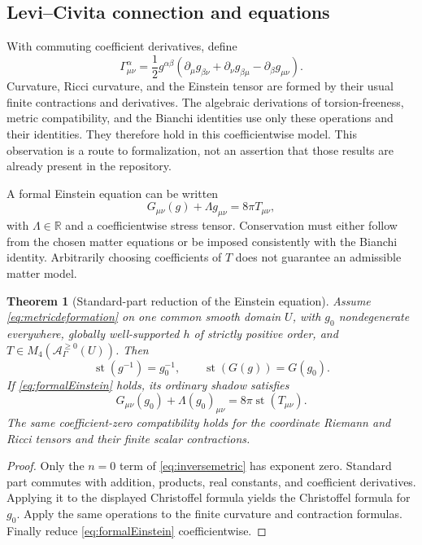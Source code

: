 \documentclass[11pt,a4paper]{article}
\numberwithin{equation}{section}
\newtheorem{theorem}{Theorem}[section]
\theoremstyle{definition}
\theoremstyle{remark}
\newcommand{\R}{\mathbb R}
\newcommand{\Alg}{\mathcal A_{\Gamma}}
\DeclareMathOperator{\st}{st}
\begin{document}
\subsection{Levi--Civita connection and equations}
With commuting coefficient derivatives, define
\begin{equation}
 \Gamma^\alpha_{\mu\nu}
 =\frac12 g^{\alpha\beta}
 (\partial_\mu g_{\beta\nu}+\partial_\nu g_{\beta\mu}
 -\partial_\beta g_{\mu\nu}).
\end{equation}
Curvature, Ricci curvature, and the Einstein tensor are formed by their usual finite contractions and derivatives. The algebraic derivations of torsion-freeness, metric compatibility, and the Bianchi identities use only these operations and their identities. They therefore hold in this coefficientwise model. This observation is a route to formalization, not an assertion that those results are already present in the repository.

A formal Einstein equation can be written
\begin{equation}\label{eq:formalEinstein}
 G_{\mu\nu}(g)+\Lambda g_{\mu\nu}=8\pi T_{\mu\nu},
\end{equation}
with $\Lambda\in\R$ and a coefficientwise stress tensor. Conservation must either follow from the chosen matter equations or be imposed consistently with the Bianchi identity. Arbitrarily choosing coefficients of $T$ does not guarantee an admissible matter model.

\begin{theorem}[Standard-part reduction of the Einstein equation]\label{thm:reduction}
Assume \eqref{eq:metricdeformation} on one common smooth domain $U$, with $g_0$ nondegenerate everywhere, globally well-supported $h$ of strictly positive order, and $T\in M_4(\Alg^{\geq0}(U))$. Then
\begin{equation}\label{eq:Einsteinreduction}
 \st(g^{-1})=g_0^{-1},\qquad
 \st(G(g))=G(g_0).
\end{equation}
If \eqref{eq:formalEinstein} holds, its ordinary shadow satisfies
\begin{equation}
 G_{\mu\nu}(g_0)+\Lambda(g_0)_{\mu\nu}
 =8\pi\st(T_{\mu\nu}).
\end{equation}
The same coefficient-zero compatibility holds for the coordinate Riemann and Ricci tensors and their finite scalar contractions.
\end{theorem}
\begin{proof}
Only the $n=0$ term of \eqref{eq:inversemetric} has exponent zero. Standard part commutes with addition, products, real constants, and coefficient derivatives. Applying it to the displayed Christoffel formula yields the Christoffel formula for $g_0$. Apply the same operations to the finite curvature and contraction formulas. Finally reduce \eqref{eq:formalEinstein} coefficientwise.
\end{proof}
\end{document}
